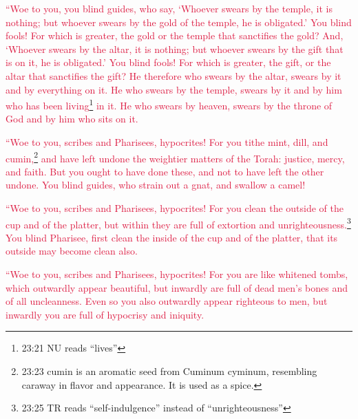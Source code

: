 \myverse{}\textcolor{crimson}{“Woe to you, you blind guides, who say, ‘Whoever swears
	by the temple, it is nothing; but whoever swears by the gold of the temple, he is obligated.’
}
\myverse{}\textcolor{crimson}{You blind fools! For which is greater, the gold or the temple that sanctifies
	the gold?
}
\myverse{}\textcolor{crimson}{And, ‘Whoever swears by the altar, it is nothing; but whoever swears
	by the gift that is on it, he is obligated.’
}
\myverse{}\textcolor{crimson}{You blind fools! For which is greater, the gift, or the altar that sanctifies
	the gift?
}
\myverse{}\textcolor{crimson}{He therefore who swears by the altar, swears by it and by everything
	on it.
}
\myverse{}\textcolor{crimson}{He who swears by the temple, swears by it and by him who has been living}\footnote{23:21 NU reads “lives”}
\textcolor{crimson}{in it.
}
\myverse{}\textcolor{crimson}{He who swears by heaven, swears by the throne of God and by him who sits
	on it.}

\myverse{}\textcolor{crimson}{“Woe to you, scribes and Pharisees, hypocrites! For you
	tithe mint, dill, and cumin,}\footnote{23:23 cumin is an aromatic seed from Cuminum cyminum, resembling caraway in flavor and appearance.
	It is used as a spice.}
\textcolor{crimson}{and have left undone the weightier matters of the Torah: justice, mercy, and faith. But you ought
	to have done these, and not to have left the other undone.
}
\myverse{}\textcolor{crimson}{You blind guides, who strain out a gnat, and swallow a camel!
}

\myverse{}\textcolor{crimson}{“Woe to you, scribes and Pharisees, hypocrites! For you
	clean the outside of the cup and of the platter, but within they are full of extortion and unrighteousness.}\footnote{23:25 TR reads “self-indulgence” instead of “unrighteousness”}
\myverse{}\textcolor{crimson}{You blind Pharisee, first clean the inside of the cup and of the platter,
	that its outside may become clean also.}

\myverse{}\textcolor{crimson}{“Woe to you, scribes and Pharisees, hypocrites! For you
	are like whitened tombs, which outwardly appear beautiful, but inwardly are full of dead men’s bones and
	of all uncleanness.
}
\myverse{}\textcolor{crimson}{Even so you also outwardly appear righteous to men, but inwardly you
	are full of hypocrisy and iniquity.}

